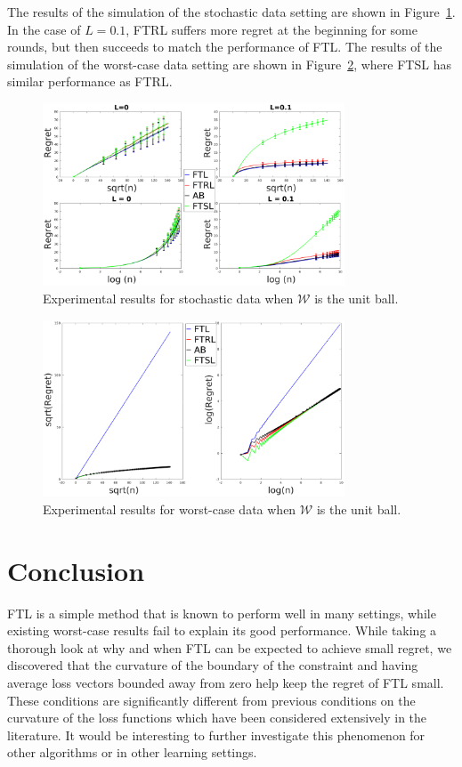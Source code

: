 \documentclass[english]{article}
\newcommand{\cW}{\mathcal{W}}
\begin{document}
The results of the simulation of the stochastic data setting are shown in Figure~\ref{res:Stoc_unitBall}. In the case of $L=0.1$, FTRL suffers more regret at the beginning for some rounds, but then succeeds to match the performance of FTL.
The results of the simulation of the worst-case data setting are shown in Figure~\ref{res:WorstCase_unitBall}, where FTSL has similar performance as FTRL.
\begin{figure}[h]
	\centering
	\includegraphics[width=0.8\textwidth]{figures/ExpResults/Stoc_unitBall}	
	\caption{Experimental results for stochastic data when $\cW$ is the unit ball. \label{res:Stoc_unitBall}}
\end{figure}

\begin{figure}[h]
	\centering
	\includegraphics[width=0.8\textwidth]{figures/ExpResults/WorstCase_unitBall}	
	\caption{Experimental results for worst-case data when $\cW$ is the unit ball. \label{res:WorstCase_unitBall}}
\end{figure}



\section{Conclusion}
FTL is a simple method that is known to perform well in many settings, while 
existing worst-case results fail to explain its good performance.
While taking a thorough look at why and when FTL can be expected to achieve small regret, we discovered that the curvature of the boundary of the constraint and having average loss vectors bounded away from zero help keep the regret of FTL small. These conditions are significantly different from previous conditions on the curvature of the loss functions which have been considered extensively in the literature.
It would be interesting to further investigate this phenomenon for other algorithms or in other learning settings.
\end{document}
